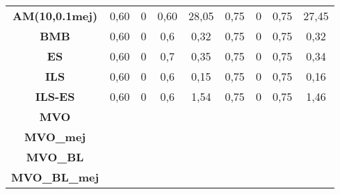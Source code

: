 \begin{table}[H]
{\begin{tabular}{ccccccccc}
\multicolumn{1}{|c|}{\textbf{AM(10,0.1mej)}} & 0,60 & 0 & 0,60 & \multicolumn{1}{c|}{28,05} & 0,75 & 0 & 0,75 & \multicolumn{1}{c|}{27,45} \\
\multicolumn{1}{|c|}{\textbf{BMB}} & 0,60 & 0 & 0,6 & \multicolumn{1}{c|}{0,32} & 0,75 & 0 & 0,75 & \multicolumn{1}{c|}{0,32} \\
\multicolumn{1}{|c|}{\textbf{ES}} & 0,60 & 0 & 0,7 & \multicolumn{1}{c|}{0,35} & 0,75 & 0 & 0,75 & \multicolumn{1}{c|}{0,34} \\
\multicolumn{1}{|c|}{\textbf{ILS}} & 0,60 & 0 & 0,6 & \multicolumn{1}{c|}{0,15} & 0,75 & 0 & 0,75 & \multicolumn{1}{c|}{0,16} \\
\multicolumn{1}{|c|}{\textbf{ILS-ES}} & 0,60 & 0 & 0,6 & \multicolumn{1}{c|}{1,54} & 0,75 & 0 & 0,75 & \multicolumn{1}{c|}{1,46} \\
\multicolumn{1}{|c|}{\textbf{MVO}} & \multicolumn{1}{l}{} & \multicolumn{1}{l}{} & \multicolumn{1}{l}{} & \multicolumn{1}{l|}{} & \multicolumn{1}{l}{} & \multicolumn{1}{l}{} & \multicolumn{1}{l}{} & \multicolumn{1}{l|}{} \\
\multicolumn{1}{|c|}{\textbf{MVO\_mej}} & \multicolumn{1}{l}{} & \multicolumn{1}{l}{} & \multicolumn{1}{l}{} & \multicolumn{1}{l|}{} & \multicolumn{1}{l}{} & \multicolumn{1}{l}{} & \multicolumn{1}{l}{} & \multicolumn{1}{l|}{} \\
\multicolumn{1}{|c|}{\textbf{MVO\_BL}} & \multicolumn{1}{l}{} & \multicolumn{1}{l}{} & \multicolumn{1}{l}{} & \multicolumn{1}{l|}{} & \multicolumn{1}{l}{} & \multicolumn{1}{l}{} & \multicolumn{1}{l}{} & \multicolumn{1}{l|}{} \\
\multicolumn{1}{|c|}{\textbf{MVO\_BL\_mej}} & \multicolumn{1}{l}{} & \multicolumn{1}{l}{} & \multicolumn{1}{l}{} & \multicolumn{1}{l|}{} & \multicolumn{1}{l}{} & \multicolumn{1}{l}{} & \multicolumn{1}{l}{} & \multicolumn{1}{l|}{} \\ \hline
\end{tabular}
}
\end{table}

